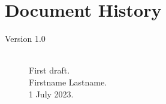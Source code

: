 \documentclass{CSSRforAfrica}
\begin{document}
  

\newpage
\section*{Document History}
\label{document_history}

\begin{description}

\item [Version 1.0]~\\
First draft. \\
Firstname  Lastname. \\                                     %
1 July 2023.                                                        %



\end{description}
\end{document}
